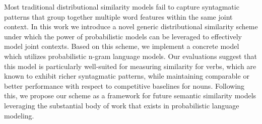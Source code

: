 Most traditional distributional similarity models fail to capture syntagmatic patterns that group together multiple word features within the same joint context. In this work we introduce a novel generic distributional similarity scheme under which the power of probabilistic models can be leveraged to effectively model joint contexts. Based on this scheme, we implement a concrete model which utilizes probabilistic n-gram language models. Our evaluations suggest that this model is particularly well-suited for measuring similarity for verbs, which are known to exhibit richer syntagmatic patterns, while maintaining comparable or better performance with respect to competitive baselines for nouns. Following this, we propose our scheme as a framework for future semantic similarity models leveraging the substantial body of work that exists in probabilistic language modeling.
